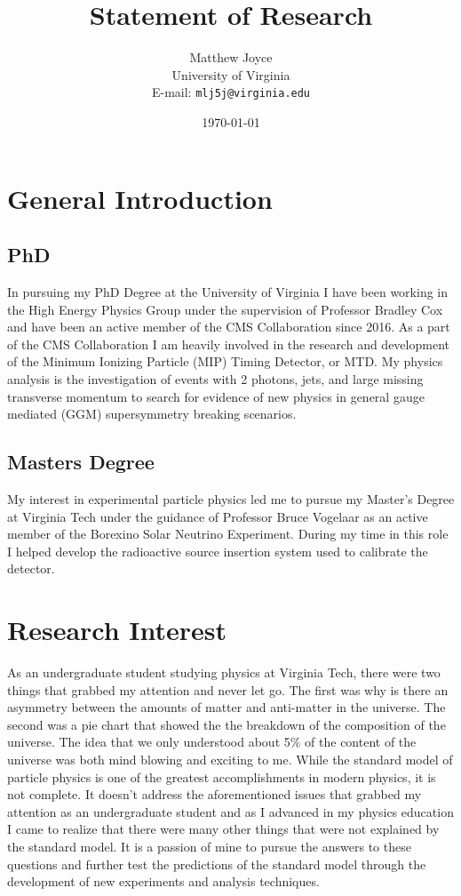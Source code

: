 \documentclass[a4paper]{article}
\title{Statement of Research}
\author{Matthew Joyce\\
	University of Virginia\\
	E-mail: \texttt{mlj5j@virginia.edu}}
\date{\today}
\begin{document}
\fontsize{12}{15}
\selectfont
\maketitle

\section{General Introduction}

\subsection{PhD}
In pursuing my PhD Degree at the University of Virginia I have been working in the High Energy Physics Group under the supervision of Professor Bradley Cox and have been an active member of the CMS Collaboration since 2016.  As a part of the CMS Collaboration I am heavily involved in the research and development of the Minimum Ionizing Particle (MIP) Timing Detector, or MTD.  My physics analysis is the investigation of events with 2 photons, jets, and large missing transverse momentum to search for evidence of new physics in general gauge mediated (GGM) supersymmetry breaking scenarios.

\subsection{Masters Degree}
My interest in experimental particle physics led me to pursue my Master's Degree at Virginia Tech under the guidance of Professor Bruce Vogelaar as an active member of the Borexino Solar Neutrino Experiment.  During my time in this role I helped develop the radioactive source insertion system used to calibrate the detector.
 
\section{Research Interest}
As an undergraduate student studying physics at Virginia Tech, there were two things that grabbed my attention and never let go.  The first was why is there an asymmetry between the amounts of matter and anti-matter in the universe.  The second was a pie chart that showed the the breakdown of the composition of the universe.  The idea that we only understood about 5$\%$ of the content of the universe was both mind blowing and exciting to me.  While the standard model of particle physics is one of the greatest accomplishments in modern physics, it is not complete.  It doesn't address the aforementioned issues that grabbed my attention as an undergraduate student and as I advanced in my physics education I came to realize that there were many other things that were not explained by the standard model.  It is a passion of mine to pursue the answers to these questions and further test the predictions of the standard model through the development of new experiments and analysis techniques.
\end{document}

